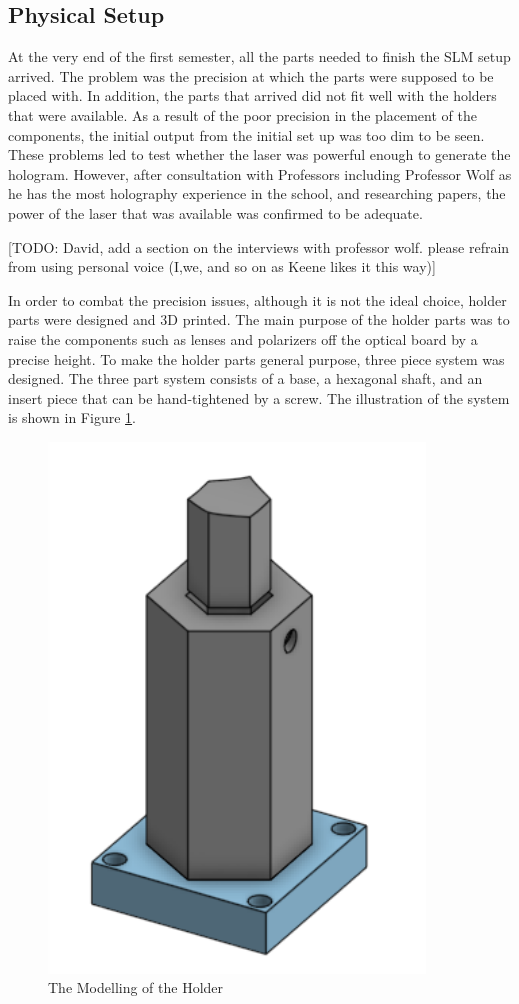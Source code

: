 \documentclass[12pt]{article}
\begin{document}
\subsection{Physical Setup}
At the very end of the first semester, all the parts needed to finish the SLM setup arrived. The problem was the precision at which the parts were supposed to be placed with. In addition, the parts that arrived did not fit well with the holders that were available. As a result of the poor precision in the placement of the components, the initial output from the initial set up was too dim to be seen. These problems led to test whether the laser was powerful enough to generate the hologram. However, after consultation with Professors including Professor Wolf as he has the most holography experience in the school, and researching papers, the power of the laser that was available was confirmed to be adequate.

[TODO: David, add a section on the interviews with professor wolf. please refrain from using personal voice (I,we, and so on as Keene likes it this way)]

In order to combat the precision issues, although it is not the ideal choice, holder parts were designed and 3D printed. The main purpose of the holder parts was to raise the components such as lenses and polarizers off the optical board by a precise height. To make the holder parts general purpose, three piece system was designed. The three part system consists of a base, a hexagonal shaft, and an insert piece that can be hand-tightened by a screw. The illustration of the system is shown in Figure \ref{fig:holder}.

\begin{figure}
    \centering
    \includegraphics[width=100mm]{holder.png}
    \caption{The Modelling of the Holder}
    \label{fig:holder}
\end{figure}
\end{document}
